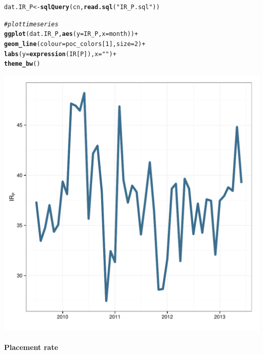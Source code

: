 \documentclass[12pt]{article}\usepackage[]{graphicx}\usepackage[]{color}
\makeatletter
\def\maxwidth{ %
  \ifdim\Gin@nat@width>\linewidth
    \linewidth
  \else
    \Gin@nat@width
  \fi
}
\newcommand{\hlnum}[1]{\textcolor[rgb]{0.686,0.059,0.569}{#1}}%
\newcommand{\hlstr}[1]{\textcolor[rgb]{0.192,0.494,0.8}{#1}}%
\newcommand{\hlcom}[1]{\textcolor[rgb]{0.678,0.584,0.686}{\textit{#1}}}%
\newcommand{\hlopt}[1]{\textcolor[rgb]{0,0,0}{#1}}%
\newcommand{\hlstd}[1]{\textcolor[rgb]{0.345,0.345,0.345}{#1}}%
\newcommand{\hlkwb}[1]{\textcolor[rgb]{0.69,0.353,0.396}{#1}}%
\newcommand{\hlkwc}[1]{\textcolor[rgb]{0.333,0.667,0.333}{#1}}%
\newcommand{\hlkwd}[1]{\textcolor[rgb]{0.737,0.353,0.396}{\textbf{#1}}}%
\newenvironment{kframe}{%
 \def\at@end@of@kframe{}%
 \ifinner\ifhmode%
  \def\at@end@of@kframe{\end{minipage}}%
  \begin{minipage}{\columnwidth}%
 \fi\fi%
 \def\FrameCommand##1{\hskip\@totalleftmargin \hskip-\fboxsep
 \colorbox{shadecolor}{##1}\hskip-\fboxsep
     \hskip-\linewidth \hskip-\@totalleftmargin \hskip\columnwidth}%
 \MakeFramed {\advance\hsize-\width
   \@totalleftmargin\z@ \linewidth\hsize
   \@setminipage}}%
 {\par\unskip\endMakeFramed%
 \at@end@of@kframe}
\newenvironment{knitrout}{}{} %
\makeatother
\begin{document}
\begin{knitrout}
\color{fgcolor}\begin{kframe}
\begin{alltt}
\hlstd{dat.IR_P} \hlkwb{<-} \hlkwd{sqlQuery}\hlstd{(cn,} \hlkwd{read.sql}\hlstd{(}\hlstr{"IR_P.sql"}\hlstd{))}

\hlcom{#plot time series}
\hlkwd{ggplot}\hlstd{(dat.IR_P,} \hlkwd{aes}\hlstd{(}\hlkwc{y}\hlstd{=IR_P,} \hlkwc{x}\hlstd{=month))} \hlopt{+}
  \hlkwd{geom_line}\hlstd{(}\hlkwc{colour}\hlstd{=poc_colors[}\hlnum{1}\hlstd{],} \hlkwc{size}\hlstd{=}\hlnum{2}\hlstd{)} \hlopt{+}
  \hlkwd{labs}\hlstd{(}\hlkwc{y} \hlstd{=} \hlkwd{expression}\hlstd{(IR[P]),} \hlkwc{x} \hlstd{=} \hlstr{""}\hlstd{)} \hlopt{+}
  \hlkwd{theme_bw}\hlstd{()}
\end{alltt}
\end{kframe}

{\centering \includegraphics[width=\maxwidth]{figure/IR_P} 

}



\end{knitrout}


\paragraph{Placement rate}
\end{document}
